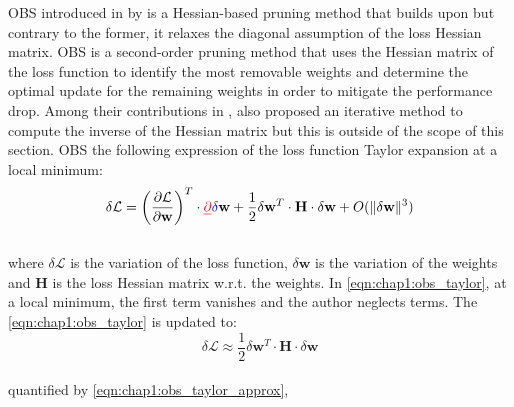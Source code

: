 \ac{OBS} introduced in \cite{DBLP:conf/nips/HassibiS92} by
\citeauthor{DBLP:conf/nips/HassibiS92} is a Hessian-based pruning method that
builds upon \cite{DBLP:conf/nips/CunDS89} but contrary to the former, it relaxes
the diagonal assumption of the loss Hessian matrix. \ac{OBS} is a second-order
pruning method that uses the Hessian matrix of the loss function to identify the
most removable weights and determine the optimal update for the remaining
weights in order to mitigate the performance drop. Among their contributions in
\cite{DBLP:conf/nips/HassibiS92}, \cite{DBLP:conf/nips/HassibiS92} also proposed
an iterative method to compute the inverse of the Hessian matrix but this is
outside of the scope of this section. \ac{OBS} \DIFdelbegin {}\DIFdelend \DIFaddbegin {}\DIFaddend the following
expression of the loss function Taylor expansion at a local minimum:\\

\begin{equation}
  \label{eqn:chap1:obs_taylor}
  \delta \mathcal{L} = \left( \frac{\partial \mathcal{L}}{\partial \mathbf{w}} \right)^T \cdot  \DIFdelbegin \DIFdel{\partial }\DIFdelend \DIFaddbegin \DIFadd{\delta }\DIFaddend \mathbf{w} + \frac{1}{2} \delta \mathbf{w}^T \cdot \mathbf{H} \cdot \delta \mathbf{w} + O(\| \delta \mathbf{w}\|^3)
\end{equation}\\

\noindent where $\delta \mathcal{L}$ is the variation of the loss function,
$\delta \mathbf{w}$ is the variation of the weights and $\mathbf{H}$ is the loss
Hessian matrix w.r.t. the weights. In \cref{eqn:chap1:obs_taylor}, at a local
minimum, the first term vanishes and the author neglects \DIFdelbegin {}\DIFdelend \DIFaddbegin {}\DIFaddend terms. The
\cref{eqn:chap1:obs_taylor} is updated to:\\

\begin{equation}
  \label{eqn:chap1:obs_taylor_approx}
  \delta \mathcal{L} \approx \frac{1}{2} \delta \mathbf{w}^T \cdot \mathbf{H} \cdot \delta \mathbf{w} 
\end{equation}\\

\noindent \DIFdelbegin {}\DIFdelend \DIFaddbegin {}\DIFaddend quantified by
\cref{eqn:chap1:obs_taylor_approx}, \DIFdelbegin {}%

